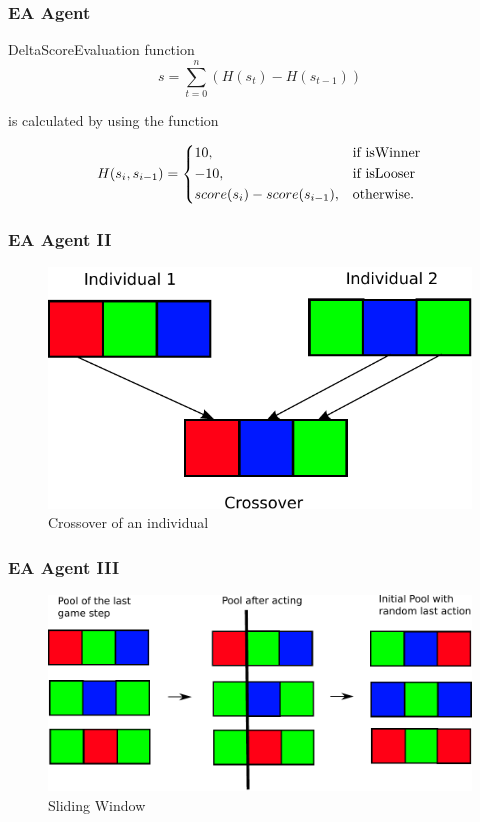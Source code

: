 \documentclass{beamer}
\begin{document}
\begin{frame}
\frametitle{EA Agent}

DeltaScoreEvaluation function 
\begin{equation*}
s = \sum_{t=0}^n (H(s_t) - H(s_{t-1}))
\end{equation*}

is calculated by using the function

\begin{equation*}
    H(s_i, s_{i-1}) = 
\begin{dcases}
    10, & \text{if isWinner}  \\
    -10, & \text{if isLooser}  \\
    score(s_i) - score(s_{i-1}), & \text{otherwise.}
\end{dcases}
\end{equation*}
\end{frame}



\begin{frame}
\frametitle{EA Agent II}
\begin{figure}[H]
\centering
\includegraphics[scale=0.6]{../report/images/crossover.pdf}
\caption{Crossover of an individual}
\label{fig:crossover}
\end{figure}
\end{frame}


\begin{frame}
\frametitle{EA Agent III}
\begin{figure}[H]
\centering
\includegraphics[scale=0.6]{../report/images/sliding_window.pdf}
\caption{Sliding Window}
\label{fig:sliding_window}
\end{figure}
\end{frame}
\end{document}
